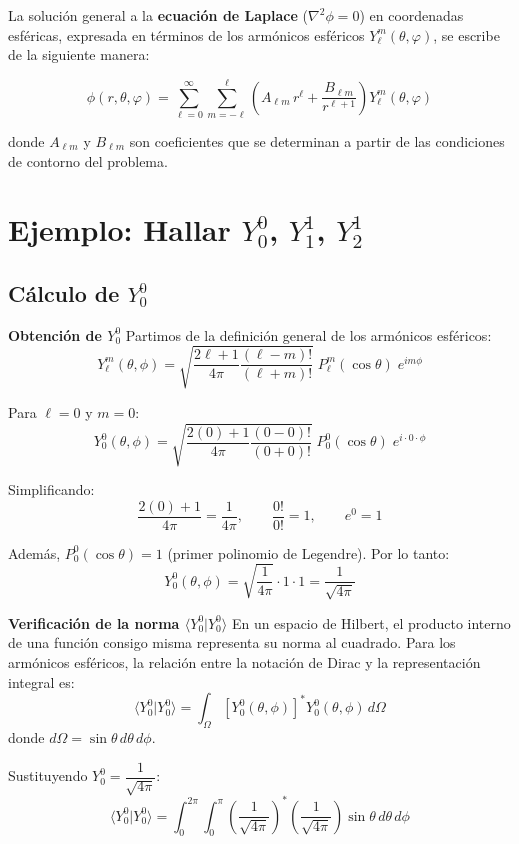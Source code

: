 \documentclass[a4paper]{article}
\begin{document}
La solución general a la \textbf{ecuación de Laplace} ($\nabla^2 \phi = 0$) en coordenadas esféricas, expresada en términos de los armónicos esféricos $Y_\ell^m(\theta, \varphi)$, se escribe de la siguiente manera:

$$
\phi(r, \theta, \varphi) = \sum_{\ell=0}^\infty \sum_{m=-\ell}^{\ell} \left( A_{\ell m} \, r^\ell + \frac{B_{\ell m}}{r^{\ell+1}} \right) Y_\ell^m(\theta, \varphi)
$$

donde $A_{\ell m}$ y $B_{\ell m}$ son coeficientes que se determinan a partir de las condiciones de contorno del problema.


\section{Ejemplo: Hallar $Y_0^0$, $Y_1^1$, $Y_2^1$}

\subsection{Cálculo de $Y_0^0$}

\textbf{Obtención de $Y_0^0$}
Partimos de la definición general de los armónicos esféricos:
$$
Y_\ell^m(\theta, \phi) = \sqrt{\frac{2\ell+1}{4\pi} \frac{(\ell-m)!}{(\ell+m)!}} \; P_\ell^m(\cos \theta) \; e^{i m \phi}
$$

Para $\ell = 0$ y $m = 0$:
$$
Y_0^0(\theta, \phi) = \sqrt{\frac{2(0)+1}{4\pi} \frac{(0-0)!}{(0+0)!}} \; P_0^0(\cos \theta) \; e^{i \cdot 0 \cdot \phi}
$$

Simplificando:
$$
\frac{2(0)+1}{4\pi} = \frac{1}{4\pi}, \qquad \frac{0!}{0!} = 1, \qquad e^{0} = 1
$$

Además, $P_0^0(\cos \theta) = 1$ (primer polinomio de Legendre). Por lo tanto:
$$
Y_0^0(\theta, \phi) = \sqrt{\frac{1}{4\pi}} \cdot 1 \cdot 1 = \frac{1}{\sqrt{4\pi}}
$$

\textbf{Verificación de la norma $\langle Y_0^0 | Y_0^0 \rangle$}
En un espacio de Hilbert, el producto interno de una función consigo misma representa su norma al cuadrado. Para los armónicos esféricos, la relación entre la notación de Dirac y la representación integral es:
$$
\langle Y_0^0 | Y_0^0 \rangle = \int_{\Omega} [Y_0^0(\theta, \phi)]^* Y_0^0(\theta, \phi) \, d\Omega
$$
donde $d\Omega = \sin \theta \, d\theta \, d\phi$.

Sustituyendo $Y_0^0 = \dfrac{1}{\sqrt{4\pi}}$:
$$
\langle Y_0^0 | Y_0^0 \rangle = \int_{0}^{2\pi} \int_{0}^{\pi} \left( \frac{1}{\sqrt{4\pi}} \right)^* \left( \frac{1}{\sqrt{4\pi}} \right) \sin \theta \, d\theta \, d\phi
$$
\end{document}
